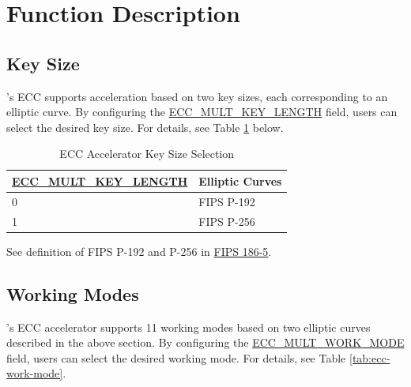 \documentclass[main\_\_EN.tex]{subfiles}
\begin{document}
\section{Function Description}
\label{sec:ecc-mode-config}
\subsection{Key Size}

\chipname{}'s ECC supports acceleration based on two key sizes, each corresponding to an elliptic curve. By configuring the \hyperref[fielddesc:ECCMULTKEYLENGTH]{ECC\_MULT\_KEY\_LENGTH} field, users can select the desired key size. For details, see Table \ref{tab:ecc-key-length} below.

\begin{table}[H]
    \centering
    \caption{ECC Accelerator Key Size Selection}
    \label{tab:ecc-key-length}
    \begin{threeparttable}
    \begin{tabular}{|p{4.2cm}|p{3.6cm}|}
    \hline
        \rowcolor{lightgray}
        \textbf{\hyperref[fielddesc:ECCMULTKEYLENGTH]{ECC\_MULT\_KEY\_LENGTH}} & \textbf{Elliptic Curves\tnote{*}} \\ \hline
        0 & FIPS P-192  \\\hline
        1 & FIPS P-256  \\\hline
    \end{tabular}
    \begin{tablenotes}
        \item[*] See definition of FIPS P-192 and P-256 in \href{https://nvlpubs.nist.gov/nistpubs/FIPS/NIST.FIPS.186-5.pdf}{FIPS 186-5}.
    \end{tablenotes}
    \end{threeparttable}
\end{table}

\subsection{Working Modes}

\chipname{}'s ECC accelerator supports 11 working modes based on two elliptic curves described in the above section. By configuring the \hyperref[fielddesc:ECCMULTWORKMODE]{ECC\_MULT\_WORK\_MODE} field, users can select the desired working mode. For details, see Table \ref{tab:ecc-work-mode}.
\end{document}
